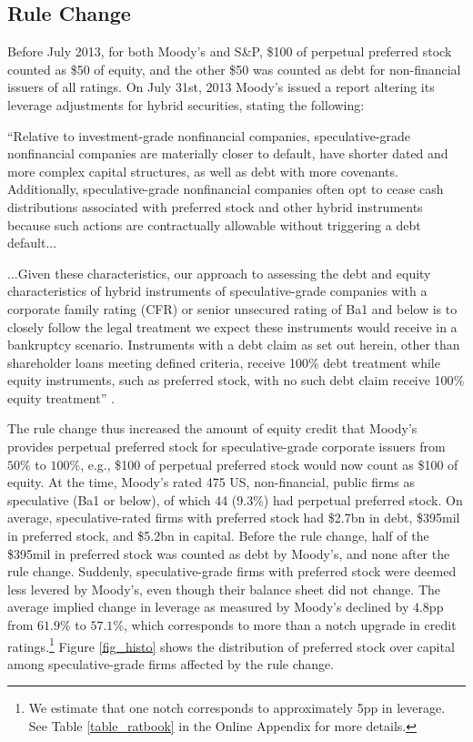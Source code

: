 \documentclass[a4paper, 12pt]{article}
\begin{document}
\subsection{Rule Change}
Before July 2013, for both Moody's and S\&P, \$100 of perpetual preferred stock counted as \$50 of equity, and the other \$50 was counted as debt for non-financial issuers of all ratings. On July 31st, 2013 Moody's issued a report altering its leverage adjustments for hybrid securities, stating the following:

\begin{displayquote}
\begin{small}
\begin{singlespace}
``Relative to investment-grade nonfinancial companies, speculative-grade nonfinancial companies are materially closer to default, have shorter dated and more complex capital structures, as well as debt with more covenants. Additionally, speculative-grade nonfinancial companies often opt to cease cash distributions associated with preferred stock and other hybrid instruments because such actions are contractually allowable without triggering a debt default...

...Given these characteristics, our approach to assessing the debt and equity characteristics of hybrid instruments of speculative-grade companies with a corporate family rating (CFR) or senior unsecured rating of Ba1 and below is to closely follow the legal treatment we expect these instruments would receive in a bankruptcy scenario. Instruments with a debt claim as set out herein, other than shareholder loans meeting defined criteria, receive 100$\%$ debt treatment while equity instruments, such as preferred stock, with no such debt claim receive 100$\%$ equity treatment'' \cite{moodydebt}.
\end{singlespace}
\end{small}
\end{displayquote}

The rule change thus increased the amount of equity credit that Moody's provides perpetual preferred stock for speculative-grade corporate issuers from $50\%$ to $100\%$, e.g., \$100 of perpetual preferred stock would now count as \$100 of equity. At the time, Moody's rated 475 US, non-financial, public firms as speculative (Ba1 or below), of which 44 (9.3\%) had perpetual preferred stock. On average, speculative-rated firms with preferred stock had \$2.7bn in debt, \$395mil in preferred stock, and \$5.2bn in capital. Before the rule change, half of the \$395mil in preferred stock was counted as debt by Moody's, and none after the rule change. Suddenly, speculative-grade firms with preferred stock were deemed less levered by Moody's, even though their balance sheet did not change. The average implied change in leverage as measured by Moody's declined by 4.8pp from $61.9\%$ to $57.1\%$, which corresponds to more than a notch upgrade in credit ratings.\footnote{We estimate that one notch corresponds to approximately 5pp in leverage. See Table \ref{table_ratbook} in the Online Appendix for more details.} Figure \ref{fig_histo} shows the distribution of preferred stock over capital among speculative-grade firms affected by the rule change.
\end{document}
